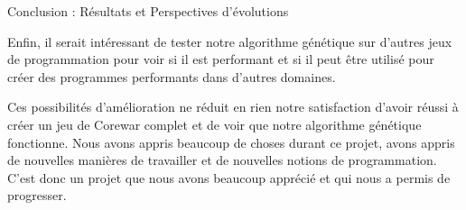 \documentclass[a4paper, 10pt]{article}
\begin{document}
\begin{section}{Conclusion : Résultats et Perspectives d'évolutions}
            \medskip
        \par
            Enfin, il serait intéressant de tester notre algorithme génétique sur d'autres jeux de programmation pour voir si il est performant et si il peut être utilisé pour créer des programmes performants dans d'autres domaines.
        \par
            Ces possibilités d'amélioration ne réduit en rien notre satisfaction d'avoir réussi à créer un jeu de Corewar complet et de voir que notre algorithme génétique fonctionne. Nous avons appris beaucoup de choses durant ce projet, avons appris de nouvelles manières de travailler et de nouvelles notions de programmation. C'est donc un projet que nous avons beaucoup apprécié et qui nous a permis de progresser.
    \end{section}

    
    
    
\end{document}
